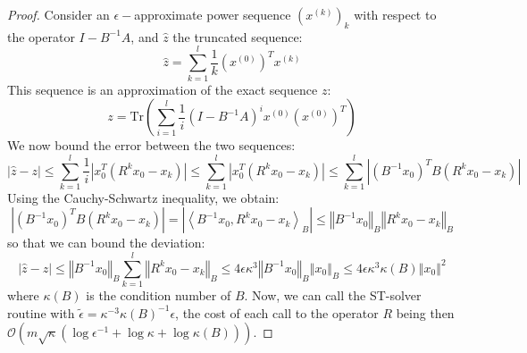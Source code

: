 \begin{proof} Consider an $\epsilon-$approximate power sequence
$\left(x^{\left(k\right)}\right)_{k}$ with respect to the operator
$I-B^{-1}A$, and $\hat{z}$ the truncated sequence: 
\[
\hat{z}=\sum_{k=1}^{l}\frac{1}{k}\left(x^{\left(0\right)}\right)^{T}x^{\left(k\right)}
\]
This sequence is an approximation of the exact sequence $z$: 
\[
z=\mbox{Tr}\left(\sum_{i=1}^{l}\frac{1}{i}\left(I-B^{-1}A\right)^{i}x^{\left(0\right)}\left(x^{\left(0\right)}\right)^{T}\right)
\]
We now bound the error between the two sequences: 
\[
\left|\hat{z}-z\right|\leq\sum_{k=1}^{l}\frac{1}{i}\left|x_{0}^{T}\left(R^{k}x_{0}-x_{k}\right)\right|\leq\sum_{k=1}^{l}\left|x_{0}^{T}\left(R^{k}x_{0}-x_{k}\right)\right|\leq\sum_{k=1}^{l}\left|\left(B^{-1}x_{0}\right)^{T}B\left(R^{k}x_{0}-x_{k}\right)\right|
\]
Using the Cauchy-Schwartz inequality, we obtain: 
\[
\left|\left(B^{-1}x_{0}\right)^{T}B\left(R^{k}x_{0}-x_{k}\right)\right|=\left|\left\langle B^{-1}x_{0},R^{k}x_{0}-x_{k}\right\rangle _{B}\right|\leq\left\Vert B^{-1}x_{0}\right\Vert _{B}\left\Vert R^{k}x_{0}-x_{k}\right\Vert _{B}
\]
so that we can bound the deviation: 
\[
\left|\hat{z}-z\right|\leq\left\Vert B^{-1}x_{0}\right\Vert _{B}\sum_{k=1}^{l}\left\Vert R^{k}x_{0}-x_{k}\right\Vert _{B}\leq4\epsilon\kappa^{3}\left\Vert B^{-1}x_{0}\right\Vert _{B}\left\Vert x_{0}\right\Vert _{B}\leq4\epsilon\kappa^{3}\kappa\left(B\right)\left\Vert x_{0}\right\Vert ^{2}
\]
where $\kappa\left(B\right)$ is the condition number of $B$. Now,
we can call the ST-solver routine with $\tilde{\epsilon}=\kappa^{-3}\kappa\left(B\right)^{-1}\epsilon$,
the cost of each call to the operator $R$ being then $\mathcal{O}\left(m\sqrt{\kappa}\left(\log\epsilon^{-1}+\log\kappa+\log\kappa\left(B\right)\right)\right)$.
\end{proof}
